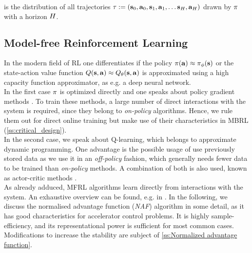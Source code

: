 \documentclass[
reprint,nofootinbib,
amsmath,amssymb,amsfonts,clevref,
aps,
prstab,
]{revtex4-2}
\begin{document}
	is the distribution of all trajectories $\tau := (\mathbf{s}_0, \mathbf{a}_0, \mathbf{s}_1, \mathbf{a}_1,\dots \mathbf{s}_H,\mathbf{a}_H)$ drawn by $\pi$ with a horizon $H$.
	
	\subsection{Model-free Reinforcement Learning}\label{s:Model-free reinforcement learning}
	In the modern field of RL one differentiates if the policy $\pi(\mathbf{a})\approx \pi_\phi(\mathbf{s})$ or the state-action value function $Q(\mathbf{s},\mathbf{a}) \approx Q_\theta(\mathbf{s},\mathbf{a})$ is approximated using a high capacity function approximator, as e.g. a deep neural network.\\
	In the first case $\pi$ is optimized directly and one speaks about policy gradient methods \cite{Sutton2018, Williams1992,Baxter2011,pmlr-v28-levine13, Schulman2015,Schulman2017}. To train these methods, a large number of direct interactions with the system is required, since they belong to \emph{on-policy} algorithms. Hence, we rule them out for direct online training but make use of their characteristics in MBRL (\cref{ss:critical_design}).\\
	In the second case, we speak about Q-learning, which belongs to approximate dynamic programming. One advantage is the possible usage of use previously stored data as we use it in an \emph{off-policy} fashion, which generally needs fewer data to be trained than \emph{on-policy} methods. A combination of both is also used, known as actor-critic methods \cite{Szepesvari2010,Lillicrap2015,Silver2014}.\\
	As already adduced, MFRL algorithms learn directly from interactions with the system. An exhaustive overview can be found, e.g. in \cite{Sutton2018,Levine2020}. In the following, we discuss the normalised advantage function (\emph{NAF}) algorithm \cite{Gu2016} in some detail, as it has good characteristics for accelerator control problems. It is highly sample-efficiency, and its representational power is sufficient for most common cases\cite{Kain2020,Hirlaender2020a}. Modifications to increase the stability are subject of \cref{ss:Normalized advantage function}.
\end{document}

